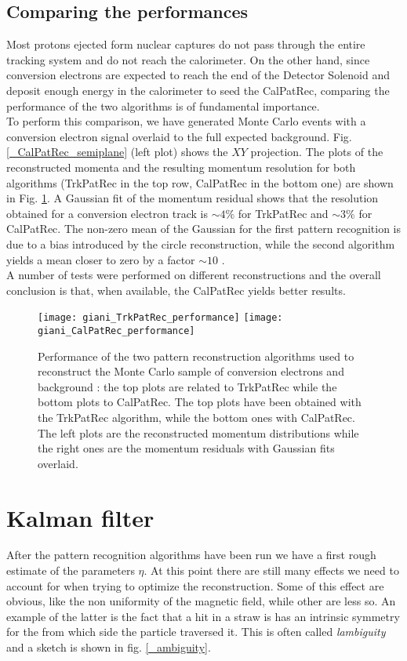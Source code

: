 \documentclass[12pt,a4paper,openright, oneside, titlepage]{book} %
\begin{document}
\subsection{Comparing the performances}
Most protons ejected form nuclear captures
do not pass through the entire tracking system and do not reach the calorimeter. 
On the other hand, since conversion electrons are expected 
to reach the end of the Detector Solenoid and deposit enough energy 
in the calorimeter to seed the CalPatRec, comparing the performance
of the two algorithms is of fundamental importance.\\
To perform this comparison, we have generated Monte Carlo events 
with a conversion electron signal overlaid to the full expected background\cite{GianiPatRec:2020}.
Fig. \ref{_CalPatRec_semiplane} (left plot) shows the $XY$ projection.
The plots of the reconstructed momenta 
and the resulting momentum resolution for both algorithms 
(TrkPatRec in the top row, CalPatRec in the bottom one) are shown in Fig. \ref{_PatRec_performance}. 
A Gaussian fit of the momentum residual shows that the resolution obtained
for a conversion electron track is $\sim 4\%$ for TrkPatRec and $\sim 3\%$ for CalPatRec. 
The non-zero mean of the Gaussian for the first pattern recognition is due to a bias introduced by the circle reconstruction, 
while the second algorithm yields a mean closer to zero by a factor $\sim 10$  \cite{GianiPatRec:2016} \cite{GianiPatRec:2020}. \\
A number of tests were performed on different reconstructions and the overall conclusion is that, 
when available, the CalPatRec yields better results.

\begin{figure}[h!]
\centering
\texttt{[image: giani\_TrkPatRec\_performance]}
\texttt{[image: giani\_CalPatRec\_performance]}
\caption{Performance of the two pattern reconstruction algorithms used to reconstruct 
the Monte Carlo sample of conversion electrons and background \cite{GianiPatRec:2020}: 
the top plots are related to TrkPatRec while the bottom plots to CalPatRec. 
The top plots have been obtained with the TrkPatRec algorithm,
while the bottom ones with CalPatRec. 
The left plots are the reconstructed momentum distributions 
while the right ones are the momentum residuals
with Gaussian fits overlaid.}
\label{_PatRec_performance}
\end{figure}

\section{Kalman filter}
After the pattern recognition algorithms have been run we have a first rough estimate of the parameters $\eta$. 
At this point there are still many effects we need to account for when trying to optimize the reconstruction. Some of this effect are obvious, like the non uniformity of the magnetic field, while other are less so. 
An example of the latter is the fact that a hit in a straw is has an intrinsic symmetry for the from which side the particle traversed it. 
This is often called \textit{lambiguity} and a sketch is shown in fig. \ref{_ambiguity}.\\
\end{document}
